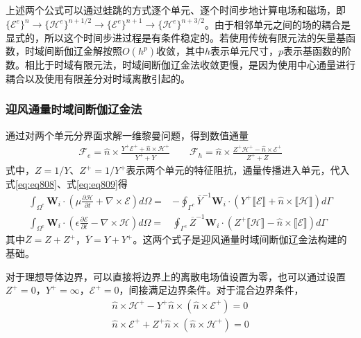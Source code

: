 \documentclass{article}
\numberwithin{equation}{section}
\renewcommand{\vec}[1]{\boldsymbol{#1}}
\begin{document}
上述两个公式可以通过蛙跳的方式逐个单元、逐个时间步地计算电场和磁场，即$\{\mathcal{E}^e\}^{n}\rightarrow \{\mathcal{H}^e\}^{n+1/2}\rightarrow \{\mathcal{E}^e\}^{n+1}\rightarrow \{\mathcal{H}^e\}^{n+3/2}$。由于相邻单元之间的场的耦合是显式的，所以这个时间步进过程是有条件稳定的。若使用传统有限元法的矢量基函数，时域间断伽辽金解按照$O(h^p)$收敛，其中$h$表示单元尺寸，$p$表示基函数的阶数。相比于时域有限元法，时域间断伽辽金法收敛更慢，是因为使用中心通量进行耦合以及使用有限差分对时域离散引起的。
\subsubsection{迎风通量时域间断伽辽金法}
通过对两个单元分界面求解一维黎曼问题，得到数值通量
\begin{align}
    \label{eq:eq829}
    \vec{\mathcal{F}}_e=\hat{n}\times\frac{Y^+\vec{\mathcal{E}}^++\hat{n}\times\vec{\mathcal{H}}^+}{Y^++Y}\qquad\vec{\mathcal{F}}_h=\hat{n}\times\frac{Z^+\vec{\mathcal{H}}^+-\hat{n}\times\vec{\mathcal{E}}^+}{Z^++Z}
\end{align}
式中，$Z=1/Y$、$Z^+=1/Y^+$表示两个单元的特征阻抗，通量传播进入单元，代入式\ref{eq:eq808}、式\ref{eq:eq809}得
\begin{align}
    \label{eq:eq830}
    \int_{\Omega^e}\mathbf{W}_i\cdot\left(\mu\frac{\partial\vec{\mathcal{H}}}{\partial t}+\nabla\times\vec{\mathcal{E}}\right)d\Omega=&-\oint_{\Gamma^e}\overline{Y}^{-1}\mathbf{W}_i\cdot(Y^+\llbracket\vec{\mathcal{E}}\rrbracket+\hat{n}\times\llbracket\vec{\mathcal{H}}\rrbracket) d\Gamma \\
    \label{eq:eq831}
    \int_{\Omega^e}\mathbf{W}_i\cdot\left(\epsilon\frac{\partial\vec{\mathcal{E}}}{\partial t}-\nabla\times\vec{\mathcal{H}}\right)d\Omega=&\oint_{\Gamma^e}\overline{Z}^{-1}\mathbf{W}_i\cdot(Z^+\llbracket\vec{\mathcal{H}}\rrbracket-\hat{n}\times\llbracket\vec{\mathcal{E}}\rrbracket) d\Gamma
\end{align}
其中$\overline{Z}=Z+Z^+$，$\overline{Y}=Y+Y^+$。这两个式子是迎风通量时域间断伽辽金法构建的基础。\par
对于理想导体边界，可以直接将边界上的离散电场值设置为零，也可以通过设置$Z^+=0$，$Y^+=\infty$，$\vec{\mathcal{E}}^+=0$，间接满足边界条件。对于混合边界条件，
\begin{align}
    \label{eq:eq832}
    \hat{n}\times\vec{\mathcal{H}}^+-Y^+\hat{n}\times(\hat{n}\times\vec{\mathcal{E}}^+)=0 \\
    \label{eq:eq833}
    \hat{n}\times\vec{\mathcal{E}}^++Z^+\hat{n}\times(\hat{n}\times\vec{\mathcal{H}}^+)=0
\end{align}
\end{document}
